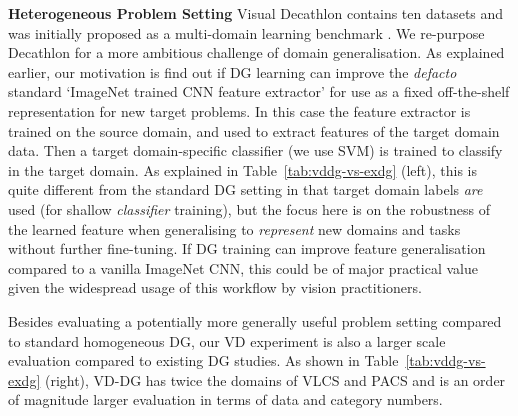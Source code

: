 \documentclass[10pt,twocolumn,letterpaper]{article}
\newcommand{\keypoint}[1]{\vspace{0.1cm}\noindent\textbf{#1}\quad}
\begin{document}
\keypoint{Heterogeneous Problem Setting}
Visual Decathlon contains ten datasets and was initially proposed as a multi-domain learning benchmark  \cite{Rebuffi17}. We re-purpose Decathlon for a more ambitious challenge of domain generalisation. As explained earlier, our motivation is find out if DG learning can improve the \emph{defacto} standard `ImageNet trained CNN feature extractor' for use as a fixed off-the-shelf representation for new target problems. In this case the feature extractor is trained on the source domain, and used to extract features of the target domain data. Then a target domain-specific classifier (we use SVM) is trained to classify in the target domain. As explained in Table~\ref{tab:vddg-vs-exdg} (left), this is quite different from the standard DG setting in that target domain labels \emph{are} used (for shallow \emph{classifier} training), but the focus here is on the robustness of the  learned feature when generalising to \emph{represent} new domains and tasks without further fine-tuning. If DG training can improve feature generalisation compared to a vanilla ImageNet CNN, this could be of major practical value given the widespread usage of this workflow by vision practitioners.

Besides evaluating a potentially more generally useful problem setting compared to standard homogeneous DG, our VD experiment is also a larger scale evaluation compared to existing DG studies. As shown in Table~\ref{tab:vddg-vs-exdg} (right), VD-DG has twice the domains of VLCS and PACS and is an order of magnitude larger evaluation in terms of data and category numbers. 
\end{document}
